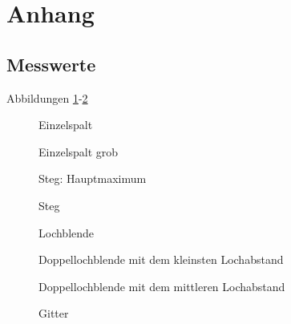 \documentclass[12pt,a4paper,titlepage,headinclude,bibtotoc]{scrartcl}
\begin{document}
\section{Anhang}
\subsection{Messwerte}
Abbildungen \ref{fig:spalt}-\ref{fig:gitter}
\begin{figure}[!htb]
	\centering
	
	\caption{Einzelspalt}
	\label{fig:spalt}
\end{figure}

\begin{figure}[!htb]
	\centering
	
	\caption{Einzelspalt grob}
\end{figure}

\begin{figure}[!htb]
	\centering
	
	\caption{Steg: Hauptmaximum}
\end{figure}

\begin{figure}[!htb]
	\centering
	
	\caption{Steg}
\end{figure}

\begin{figure}[!htb]
	\centering
	
	\caption{Lochblende}
\end{figure}

\begin{figure}[!htb]
	\centering
	
	\caption{Doppellochblende mit dem kleinsten Lochabstand}
\end{figure}

\begin{figure}[!htb]
	\centering
	
	\caption{Doppellochblende mit dem mittleren Lochabstand}
\end{figure}

\begin{figure}[!htb]
	\centering
	
	\caption{Gitter}
	\label{fig:gitter}
\end{figure}
\end{document}
